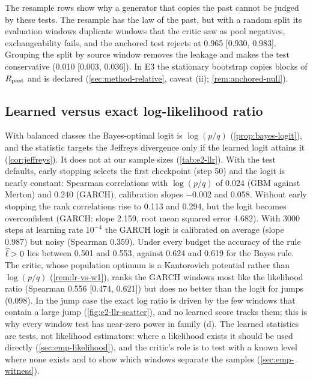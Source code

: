 The resample rows show why a generator that copies the past cannot be judged by these tests. The
resample has the law of the past, but with a random split its evaluation windows duplicate windows
that the critic saw as pool negatives, exchangeability fails, and the anchored test rejects at 0.965
[0.930, 0.983]. Grouping the split by source window removes the leakage and makes the test
conservative (0.010 [0.003, 0.036]). In E3 the stationary bootstrap copies blocks of $R_{\mathrm{past}}$ and is
declared \INVALID{} (\cref{sec:method-relative}, caveat (ii); \cref{rem:anchored-null}).

\subsection{Learned versus exact log-likelihood ratio}\label{sec:sim-llr}

\begin{table}[tbp]
  \centering
  \caption{Agreement of learned scores with the exact log-likelihood ratio $\log p(w)/q(w)$
    (E2 part f): scores fitted on 2000 independent windows of $L=20$ days per law, evaluated on 2000
    fresh windows (1000 per law); medians over 20 replications, Spearman correlation with its range
    over replications in brackets. The last row of each block is the oracle score itself.}
  \label{tab:e2-llr}
  \small
\end{table}

With balanced classes the Bayes-optimal logit is $\log(p/q)$ (\cref{prop:bayes-logit}), and the
\LRC{} statistic targets the Jeffreys divergence only if the learned logit attains it
(\cref{cor:jeffreys}). It does not at our sample sizes (\cref{tab:e2-llr}). With the test defaults,
early stopping selects the first checkpoint (step 50) and the logit is nearly constant: Spearman
correlations with $\log(p/q)$ of 0.024 (GBM against Merton) and 0.240 (GARCH), calibration slopes
$-0.002$ and 0.058. Without early stopping the rank correlations rise to 0.113 and 0.294, but the
logit becomes overconfident (GARCH: slope 2.159, root mean squared error 4.682). With 3000 steps at
learning rate $10^{-4}$ the GARCH logit is calibrated on average (slope 0.987) but noisy (Spearman
0.359). Under every budget the accuracy of the rule $\widehat{\ell}>0$ lies between 0.501 and 0.553, against
0.624 and 0.619 for the Bayes rule. The \WC{} critic, whose population optimum is a Kantorovich
potential rather than $\log(p/q)$ (\cref{rem:lr-vs-w1}), ranks the GARCH windows most like the
likelihood ratio (Spearman 0.556 [0.474, 0.621]) but does no better than the logit for jumps
(0.098). In the jump case the exact log ratio is driven by the few windows that contain a large
jump (\cref{fig:e2-llr-scatter}), and no learned score tracks them; this is why every window test
has near-zero power in family (d). The learned statistics are tests, not likelihood estimators:
where a likelihood exists it should be used directly (\cref{sec:emp-likelihood}), and the critic's
role is to test with a known level where none exists and to show which windows separate the samples
(\cref{sec:emp-witness}).

